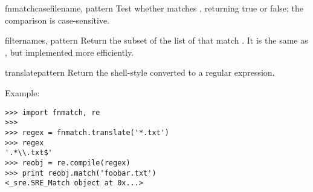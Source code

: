 \begin{funcdesc}{fnmatchcase}{filename, pattern}
Test whether  matches , returning true or
false; the comparison is case-sensitive.
\end{funcdesc}

\begin{funcdesc}{filter}{names, pattern}
Return the subset of the list of  that match .
It is the same as , but
implemented more efficiently.
\end{funcdesc}

\begin{funcdesc}{translate}{pattern}
Return the shell-style  converted to a regular
expression.

Example:

\begin{verbatim}
>>> import fnmatch, re
>>>
>>> regex = fnmatch.translate('*.txt')
>>> regex
'.*\\.txt$'
>>> reobj = re.compile(regex)
>>> print reobj.match('foobar.txt')
<_sre.SRE_Match object at 0x...>
\end{verbatim}
\end{funcdesc}

\begin{seealso}
\end{seealso}
